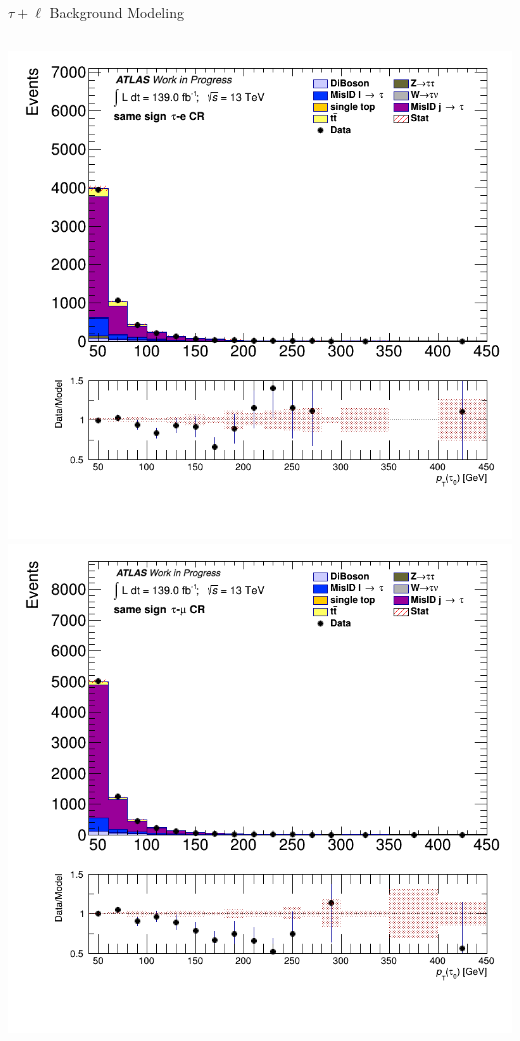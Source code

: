\documentclass[aspectratio=169,xcolor=table]{beamer}
\begin{document}
\begin{frame}[t]{$\tau+\ell$ Background Modeling}
\begin{columns}[t]
          \includegraphics[height=.45\textheight,keepaspectratio=true]{taulep_1p_3p/v09/tau_0_pt_SS_TAUEL.png}
          \includegraphics[height=.45\textheight,keepaspectratio=true]{taulep_1p_3p/v09/tau_0_pt_SS_TAUMU.png}



\end{columns}
\end{frame}
\end{document}

